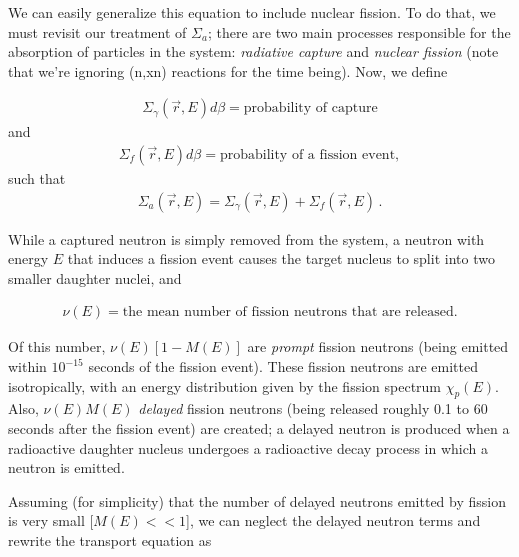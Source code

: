 \documentclass[12pt]{article}
\newcommand{\rvec}{\ensuremath{\vec{r}}}
\begin{document}
We can easily generalize this equation to include nuclear fission.
To do that, we must revisit our treatment of $\Sigma_a$; there are two main 
processes responsible for the absorption of particles in the system:
\textit{radiative capture} and \textit{nuclear fission} (note that we're 
ignoring (n,xn) reactions for the time being). Now, we define

\begin{align*}
\Sigma_\gamma(\rvec,E)d\beta = \textrm{probability of capture}
\end{align*}
and
\begin{align*}
\Sigma_f(\rvec,E)d\beta = \textrm{probability of a fission event},
\end{align*}
such that
\begin{align*}
\Sigma_a(\rvec,E) = \Sigma_\gamma(\rvec,E) + \Sigma_f(\rvec,E)\,.
\end{align*}

While a captured neutron is simply removed from the system, a neutron with 
energy $E$ that induces a fission event causes the target nucleus to split 
into two smaller daughter nuclei, and 

\begin{align*}
\nu(E) = \textrm{the mean number of fission neutrons that are released}.
\end{align*}

Of this number, $\nu(E)[1-M(E)]$ are \textit{prompt} fission neutrons (being 
emitted within $10^{-15}$ seconds of the fission event). These fission 
neutrons are emitted isotropically, with an energy distribution given by the 
fission spectrum $\chi_p(E)$. Also, $\nu(E)M(E)$ \textit{delayed} fission 
neutrons (being released roughly 0.1 to 60 seconds after the fission event) 
are created; a delayed neutron is produced when a radioactive daughter nucleus 
undergoes a radioactive decay process in which a neutron is emitted. 

Assuming (for simplicity) that the number of delayed neutrons emitted by 
fission is very small [$M(E)<<1$], we can neglect the delayed neutron terms 
and rewrite the transport equation as
\end{document}
